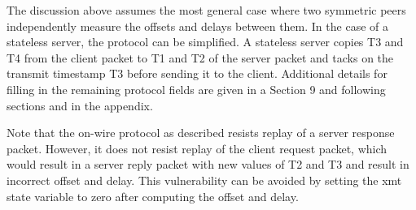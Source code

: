 The discussion above assumes the most general case where two
symmetric peers independently measure the offsets and delays between
them. In the case of a stateless server, the protocol can be
simplified. A stateless server copies T3 and T4 from the client
packet to T1 and T2 of the server packet and tacks on the transmit
timestamp T3 before sending it to the client. Additional details for
filling in the remaining protocol fields are given in a Section 9 and
following sections and in the appendix.

Note that the on-wire protocol as described resists replay of a
server response packet. However, it does not resist replay of the
client request packet, which would result in a server reply packet
with new values of T2 and T3 and result in incorrect offset and
delay. This vulnerability can be avoided by setting the xmt state
variable to zero after computing the offset and delay.
